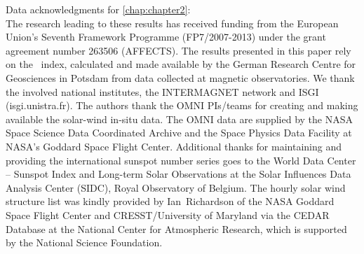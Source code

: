 Data acknowledgments for \autoref{chap:chapter2}:\\
The research leading to these results has received funding from the European Union's Seventh Framework Programme (FP7/2007-2013) under the grant agreement number 263506 (AFFECTS). The results presented in this paper rely on the \Kp{}~index, calculated and made available by the German Research Centre for Geosciences in Potsdam from data collected at magnetic observatories. We thank the involved national institutes, the INTERMAGNET network and ISGI (isgi.unistra.fr). The authors thank the OMNI PIs/teams for creating and making available the solar-wind in-situ data. The OMNI data are supplied by the NASA Space Science Data Coordinated Archive and the Space Physics Data Facility at NASA's Goddard Space Flight Center. Additional thanks for maintaining and providing the international sunspot number series goes to the World Data Center -- Sunspot Index and Long-term Solar Observations at the Solar Influences Data Analysis Center (SIDC), Royal Observatory of Belgium. The hourly solar wind structure list was kindly provided by Ian~Richardson of the NASA Goddard Space Flight Center and CRESST/University of Maryland via the CEDAR Database at the National Center for Atmospheric Research, which is supported by the National Science Foundation.


